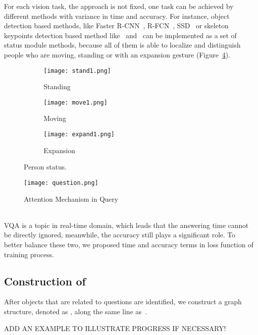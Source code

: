 For each vision task, the approach is not fixed, one task can be achieved by different methods with variance in time and accuracy. For instance, object detection based methods, like Faster R-CNN~\cite{Ren:2015:FRT:2969239.2969250}, R-FCN~\cite{DBLP:conf/nips/DaiLHS16}, SSD~\cite{DBLP:conf/eccv/LiuAESRFB16} or skeleton keypoints detection based method like~\cite{cao2017realtime} and~\cite{wei2016cpm} can be implemented as a set of status module methods, because all of them is able to localize and distinguish people who are moving, standing or with an expansion gesture (Figure~\ref{fig:Person Status}). 

\begin{figure}[thb]
\centering
        \begin{subfigure}[b]{0.088\textwidth}
                \texttt{[image: stand1.png]}
                \caption{Standing}
                \label{fig:gull}
        \end{subfigure}\quad
        \begin{subfigure}[b]{0.127\textwidth}
                \texttt{[image: move1.png]}
                \caption{Moving}
                \label{fig:gull2}
        \end{subfigure}\quad
        \begin{subfigure}[b]{0.166\textwidth}
                \texttt{[image: expand1.png]}
                \caption{Expansion}
                \label{fig:tiger}
        \end{subfigure}
        \caption{Person status.}\label{fig:Person Status}
\end{figure}




\begin{figure}[h]
\begin{center}
\texttt{[image: question.png]}
\end{center}
\caption{Attention Mechanism in Query}
\label{fig:Attention}
\end{figure}


\\
VQA is a topic in real-time domain, which leads that the answering time cannot be directly ignored, meanwhile, the accuracy still plays a significant role. To better balance these two, we proposed time and accuracy terms in loss function of training process.


\subsection{Construction of }
\label{sec-eag-construction}

After objects that are related to questions are identified, we construct a graph structure, denoted as , along the same line as~\cite{peixi2019}. 


\begin{example}
\label{exm-x1}
ADD AN EXAMPLE TO ILLUSTRATE PROGRESS IF NECESSARY!
\end{example}
